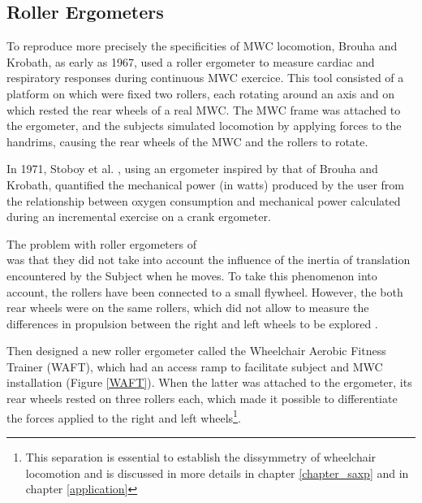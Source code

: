\subsection{Roller Ergometers}
To reproduce more precisely the specificities of  MWC locomotion, Brouha and Krobath\cite{brouha1967continuous}, as early as 1967, used a roller ergometer to measure cardiac and respiratory responses during continuous MWC exercice. This tool consisted of a platform on which were fixed two rollers, each rotating around an axis and on which rested the rear wheels of a real MWC. The MWC frame was attached to the ergometer, and the subjects simulated locomotion by applying forces to the handrims, causing the rear wheels of the MWC and the rollers to rotate. 


In 1971, Stoboy et al. \cite{stoboy1971workload}, using an ergometer inspired by that of Brouha and Krobath, quantified the mechanical power (in watts) produced by the user from the relationship between oxygen consumption and mechanical power calculated during an incremental exercise on a crank ergometer.


The problem with roller ergometers of \cite{brouha1967continuous}\\\cite{stoboy1971workload} was that they did not take into account the influence of the inertia of translation encountered by the Subject when he moves. To take this phenomenon into account, the rollers have been connected  to a small flywheel. However, the both rear wheels were on the same rollers, which did not allow to measure the differences in propulsion between the right and left wheels to be explored \cite{brouha1967continuous} \cite{stoboy1971workload}.



Then \cite{langbein1993research} \cite{langbein1993calibration} \cite{langbein1994initial}  designed a new roller ergometer called the Wheelchair Aerobic Fitness Trainer (WAFT), which had an access ramp to facilitate subject and MWC installation (Figure \ref{WAFT}). When the latter was attached to the ergometer, its rear wheels rested on three rollers each, which made it possible to differentiate the forces applied to the right and left wheels\footnote{This separation is essential to establish the dissymmetry of wheelchair locomotion and is discussed in more details in chapter \ref{chapter_saxp} and in chapter \ref{application}}.

